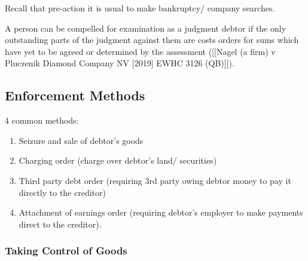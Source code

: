 \documentclass[
]{article}
\providecommand{\tightlist}{%
  \setlength{\itemsep}{0pt}\setlength{\parskip}{0pt}}
\begin{document}
Recall that pre-action it is usual to make bankruptcy/ company searches.

A person can be compelled for examination as a judgment debtor if the
only outstanding parts of the judgment against them are costs orders for
sums which have yet to be agreed or determined by the assessment
({[}{[}Nagel (a firm) v Pluczenik Diamond Company NV {[}2019{]} EWHC
3126 (QB){]}{]}).

\hypertarget{enforcement-methods}{%
\subsection{Enforcement Methods}\label{enforcement-methods}}

4 common methods:

\begin{enumerate}
\def\labelenumi{\arabic{enumi}.}
\tightlist
\item
  Seizure and sale of debtor's goods
\item
  Charging order (charge over debtor's land/ securities)
\item
  Third party debt order (requiring 3rd party owing debtor money to pay
  it directly to the creditor)
\item
  Attachment of earnings order (requiring debtor's employer to make
  payments direct to the creditor).
\end{enumerate}

\hypertarget{taking-control-of-goods}{%
\subsubsection{Taking Control of Goods}\label{taking-control-of-goods}}
\end{document}
